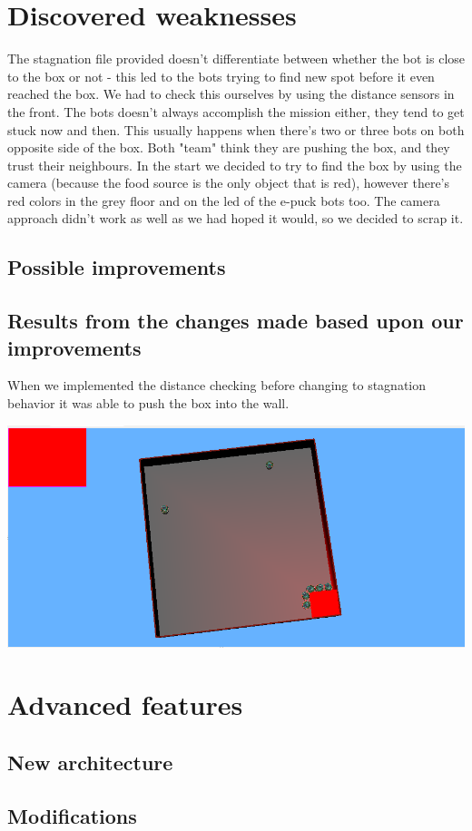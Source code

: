 \documentclass[12pt, a4paper]{article}
\begin{document}
\section{Discovered weaknesses}

The stagnation file provided doesn't differentiate between whether the bot is close to the box or not - this led to the bots trying to find new spot before it even reached the box. We had to check this ourselves by using the distance sensors in the front. 
The bots doesn't always accomplish the mission either, they tend to get stuck now and then. This usually happens when there's two or three bots on both opposite side of the box. Both "team" think they are pushing the box, and they trust their neighbours. 
In the start we decided to try to find the box by using the camera (because the food source is the only object that is red), however there's red colors in the grey floor and on the led of the e-puck bots too. The camera approach didn't work as well as we had hoped it would, so we decided to scrap it.

\subsection{Possible improvements}

\subsection{Results from the changes made based upon our improvements}
When we implemented the distance checking before changing to stagnation behavior it was able to push the box into the wall.

\includegraphics[width=\linewidth]{1.finalState}


\section{Advanced features}

\subsection{New architecture}
\subsection{Modifications}
\end{document}
